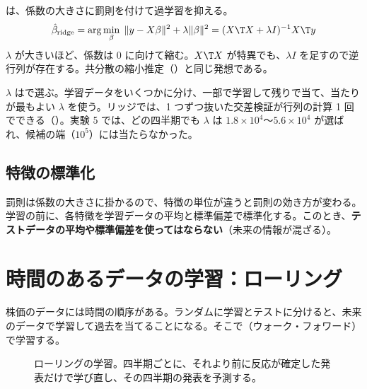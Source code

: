 は、係数の大きさに罰則を付けて過学習を抑える。
\begin{equation}
\hat\beta_{\text{ridge}} = \arg\min_\beta \;\|y - X\beta\|^2 + \lambda\|\beta\|^2 = (X\T X + \lambda I)^{-1}X\T y
\end{equation}
$\lambda$ が大きいほど、係数は 0 に向けて縮む。$X\T X$ が特異でも、$\lambda I$ を足すので逆行列が存在する。共分散の縮小推定（）と同じ発想である。

$\lambda$ はで選ぶ。学習データをいくつかに分け、一部で学習して残りで当て、当たりが最もよい $\lambda$ を使う。リッジでは、1 つずつ抜いた交差検証が行列の計算 1 回でできる（）。実験 5 では、どの四半期でも $\lambda$ は $1.8\times10^4$〜$5.6\times10^4$ が選ばれ、候補の端（$10^5$）には当たらなかった。

\subsection{特徴の標準化}

罰則は係数の大きさに掛かるので、特徴の単位が違うと罰則の効き方が変わる。学習の前に、各特徴を学習データの平均と標準偏差で標準化する。このとき、\textbf{テストデータの平均や標準偏差を使ってはならない}（未来の情報が混ざる）。

\section{時間のあるデータの学習：ローリング}

株価のデータには時間の順序がある。ランダムに学習とテストに分けると、未来のデータで学習して過去を当てることになる。そこで（ウォーク・フォワード）で学習する。

\begin{figure}[htbp]
\centering
{}
\caption{ローリングの学習。四半期ごとに、それより前に反応が確定した発表だけで学び直し、その四半期の発表を予測する。}
\label{fig:ml-rolling}
\end{figure}

